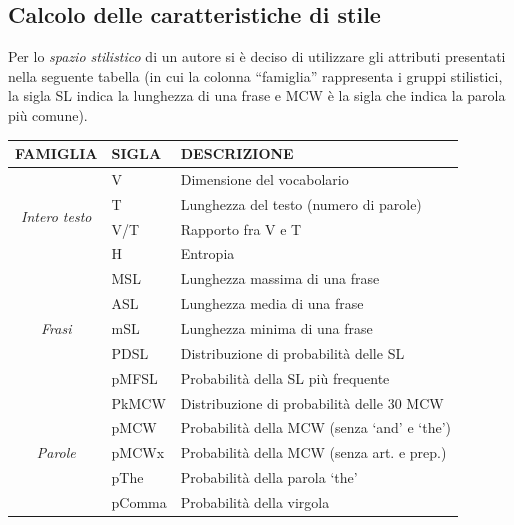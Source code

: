 \documentclass[titlepage]{article}
\begin{document}
\subsection{Calcolo delle caratteristiche di stile}
Per lo \textit{spazio stilistico} di un autore si è deciso di utilizzare gli attributi presentati nella seguente tabella (in cui la colonna ``famiglia'' rappresenta i gruppi stilistici, la sigla SL indica la lunghezza di una frase e MCW è la sigla che indica la parola più comune).
\begin{center}
\begin{tabular}{cll}
    \toprule
    \textbf{FAMIGLIA} & \textbf{SIGLA} & \textbf{DESCRIZIONE} \\
    
    \midrule
    \multirow{4}{*}{\textit{Intero testo}} & V & Dimensione del vocabolario \\
    & T & Lunghezza del testo (numero di parole) \\
    & V/T & Rapporto fra V e T \\
    & H & Entropia \\
    
    \midrule
    \multirow{5}{*}{\textit{Frasi}} & MSL & Lunghezza massima di una frase \\
    & ASL & Lunghezza media di una frase \\
    & mSL & Lunghezza minima di una frase \\
    & PDSL & Distribuzione di probabilità delle SL \\
    & pMFSL & Probabilità della SL più frequente \\
    
    \midrule
    \multirow{5}{*}{\textit{Parole}} & PkMCW & Distribuzione di probabilità delle 30 MCW \\
    & pMCW & Probabilità della MCW (senza `and' e `the') \\
    & pMCWx & Probabilità della MCW (senza art. e prep.) \\
    & pThe & Probabilità della parola `the' \\
    & pComma & Probabilità della virgola \\
    

\end{tabular}
\end{center}
\end{document}
